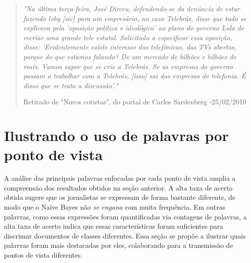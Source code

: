 \begin{quote}

\emph{"Na última terça-feira, José Dirceu, defendendo-se da denúncia de estar fazendo loby [sic] para um empresário, no caso Telebrás, disse que tudo se explicava pela 'oposição política e ideológica' ao plano do governo Lula de recriar uma grande tele estatal. Solicitado a especificar essa oposição, disse: 'Evidentemente existe interesse das telefônicas, das TVs abertas, porque do que estamos falando? De um mercado de bilhões e bilhões de reais. Vamos supor que se crie a Telebrás. Se as empresas do governo passam a trabalhar com a Telebrás, [isso] sai das empresas de telefonia. É disso que se trata a discussão'."}

{\small Retirado de "Novos cotistas", do portal de Carlos Sardenberg -25/02/2010}
\end{quote}






\section{Ilustrando o uso de palavras por ponto de vista}
\label{estudo:sec3}

A análise das principais palavras enfocadas por cada ponto de vista amplia a compreensão dos resultados obtidos na seção anterior. A alta taxa de acerto obtida sugere que os jornalistas se expressam de forma bastante diferente, de modo que o Naïve Bayes não \emph{se engana} com muita frequência. Em outras palavras, como essas expressões foram quantificadas via contagens de palavras, a alta taxa de acerto indica que essas características foram suficientes para discrimar documentos de classes diferentes. Essa seção se propõe a ilustrar quais palavras foram mais destacadas por eles, colaborando para a transmissão de pontos de vista diferentes.

